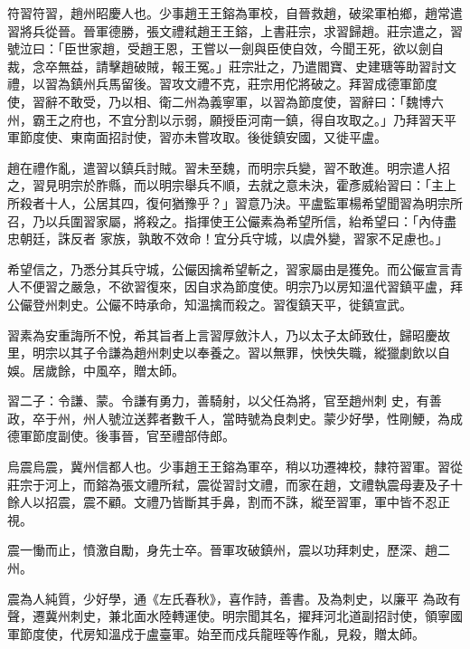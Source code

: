 
\begin{pinyinscope}

 符習符習，趙州昭慶人也。少事趙王王鎔為軍校，自晉救趙，破梁軍柏鄉，趙常遣習將兵從晉。晉軍德勝，張文禮弒趙王王鎔，上書莊宗，求習歸趙。莊宗遣之，習號泣曰：「臣世家趙，受趙王恩，王嘗以一劍與臣使自效，今聞王死，欲以劍自裁，念卒無益，請擊趙破賊，報王冤。」莊宗壯之，乃遣閻寶、史建瑭等助習討文禮，以習為鎮州兵馬留後。習攻文禮不克，莊宗用佗將破之。拜習成德軍節度
 使，習辭不敢受，乃以相、衛二州為義寧軍，以習為節度使，習辭曰：「魏博六州，霸王之府也，不宜分割以示弱，願授臣河南一鎮，得自攻取之。」乃拜習天平軍節度使、東南面招討使，習亦未嘗攻取。後徙鎮安國，又徙平盧。



 趙在禮作亂，遣習以鎮兵討賊。習未至魏，而明宗兵變，習不敢進。明宗遣人招之，習見明宗於胙縣，而以明宗舉兵不順，去就之意未決，霍彥威紿習曰：「主上所殺者十人，公居其四，復何猶豫乎？」習意乃決。平盧監軍楊希望聞習為明宗所召，乃以兵圍習家屬，將殺之。指揮使王公儼素為希望所信，紿希望曰：「內侍盡忠朝廷，誅反者
 家族，孰敢不效命！宜分兵守城，以虞外變，習家不足慮也。」



 希望信之，乃悉分其兵守城，公儼因擒希望斬之，習家屬由是獲免。而公儼宣言青人不便習之嚴急，不欲習復來，因自求為節度使。明宗乃以房知溫代習鎮平盧，拜公儼登州刺史。公儼不時承命，知溫擒而殺之。習復鎮天平，徙鎮宣武。



 習素為安重誨所不悅，希其旨者上言習厚斂汴人，乃以太子太師致仕，歸昭慶故里，明宗以其子令謙為趙州刺史以奉養之。習以無罪，怏怏失職，縱獵劇飲以自娛。居歲餘，中風卒，贈太師。



 習二子：令謙、蒙。令謙有勇力，善騎射，以父任為將，官至趙州刺
 史，有善政，卒于州，州人號泣送葬者數千人，當時號為良刺史。蒙少好學，性剛鯁，為成德軍節度副使。後事晉，官至禮部侍郎。



 烏震烏震，冀州信都人也。少事趙王王鎔為軍卒，稍以功遷裨校，隸符習軍。習從莊宗于河上，而鎔為張文禮所弒，震從習討文禮，而家在趙，文禮執震母妻及子十餘人以招震，震不顧。文禮乃皆斷其手鼻，割而不誅，縱至習軍，軍中皆不忍正視。



 震一慟而止，憤激自勵，身先士卒。晉軍攻破鎮州，震以功拜刺史，歷深、趙二州。



 震為人純質，少好學，通《左氏春秋》，喜作詩，善書。及為刺史，以廉平
 為政有聲，遷冀州刺史，兼北面水陸轉運使。明宗聞其名，擢拜河北道副招討使，領寧國軍節度使，代房知溫戍于盧臺軍。始至而戍兵龍晊等作亂，見殺，贈太師。




\end{pinyinscope}
